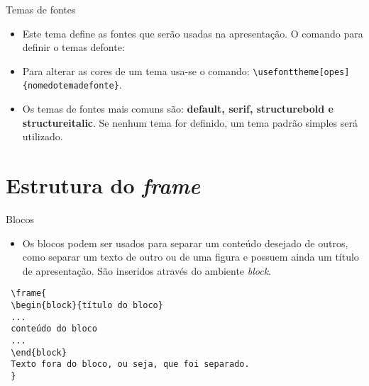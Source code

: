 \documentclass{beamer}
\begin{document}
\begin{frame}[fragile]
    \begin{block}{Temas de fontes}
        
        \begin{itemize} \justifying
            \item <1-> Este tema define as fontes que serão usadas na apresentação. O comando para definir o temas defonte:
            
            \item <2-> Para alterar as cores de um tema usa-se o comando: \verb|\usefonttheme[opes]{nomedotemadefonte}|.

            \item <3-> Os temas de fontes mais comuns são: \textbf{default, serif, structurebold e structureitalic}. Se nenhum tema for definido, um tema padrão simples será utilizado.
        \end{itemize}
    \end{block}
\end{frame}

\section{Estrutura do \textit{frame}}

\begin{frame}[fragile]
    \begin{block}{Blocos}
    \begin{itemize}
        \item <1-> Os blocos podem ser usados para separar um conteúdo desejado de outros, como separar um texto de outro ou de uma figura e possuem ainda um título de apresentação. São inseridos através do ambiente \textit{block}.

    \end{itemize}
    \pause
\begin{verbatim}
 \frame{
 \begin{block}{título do bloco} 
 ... 
 conteúdo do bloco 
 ... 
 \end{block} 
 Texto fora do bloco, ou seja, que foi separado. 
 }
 
\end{verbatim}       
    \end{block}    
\end{frame}
\end{document}
